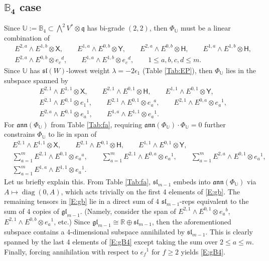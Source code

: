 \documentclass[10pt,a4paper]{amsart}
\newcommand\tensor{\otimes}
\DeclareMathOperator{\diag}{diag}
\newcommand{\gl}{\mathfrak{gl}}
\newcommand\fann{\mathfrak{ann}}
\newcommand\fsl{\mathfrak{sl}}
\newcommand\fq {\mathfrak{q}}
\newcommand{\R}{\mathbb{R}}
\newcommand\bbU{\mathbb{U}}
\newcommand\bbB{\mathbb{B}}
\newcommand\sfX{\mathsf{X}}
\newcommand\sfH{\mathsf{H}}
\newcommand\sfY{\mathsf{Y}}
\numberwithin{equation}{section}
\begin{document}
\subsection[B\_4 case]{$\boldsymbol{\bbB_4}$ case} \label{S:PhiB4}
Since $\bbU := \bbB_4 \subset \bigwedge^2 V^* \otimes \fq$ has bi-grade $(2,2)$, then $\Phi_{\bbU}$ must be a linear combination of
\begin{align*}
& E^{2,a} \wedge E^{1,b} \tensor \sfX,\qquad E^{1,a} \wedge E^{0,b} \tensor \sfY,\qquad E^{2,a} \wedge E^{0,b} \tensor \sfH, \qquad E^{1,a} \wedge E^{1,b} \tensor \sfH,\\
& E^{2,a} \wedge E^{0,b} \tensor e_c{}^d, \qquad E^{1,a} \wedge E^{1,b} \tensor e_c{}^d, \qquad 1 \le a, b,c,d \le m.
\end{align*}
Since $\bbU$ has $\fsl(W)$-lowest weight $\lambda= -2\epsilon_1$ (Table \ref{Tab:EP}), then $\Phi_{\bbU}$ lies in the subspace spanned by
{\samepage\begin{align}
& E^{2,1} \wedge E^{1,1} \tensor \sfX, \qquad E^{2,1} \wedge E^{0,1} \tensor \sfH, \qquad E^{1,1} \wedge E^{0,1} \tensor \sfY,\nonumber\\
& E^{2,1} \wedge E^{0,1} \tensor e_1{}^1, \qquad E^{2,1} \wedge E^{0,1} \tensor e_a{}^a, \qquad E^{2,1} \wedge E^{0,a} \tensor e_a{}^1, \nonumber\\
& E^{2,a} \wedge E^{0,1} \tensor e_a{}^1, \qquad E^{1,a} \wedge E^{1,1} \tensor e_a{}^1.\label{E:gb}
\end{align}}
For $\fann(\Phi_{\bbU})$ from Table \ref{Tab:fa}, requiring $\fann(\Phi_{\bbU}) \cdot \Phi_{\bbU} = 0$ further constrains $\Phi_{\bbU}$ to lie in span of
\begin{align}\label{E:gB4}
&E^{2,1} \wedge E^{1,1} \tensor \sfX, \qquad E^{2,1} \wedge E^{0,1} \tensor \sfH, \qquad E^{1,1} \wedge E^{0,1} \tensor \sfY,\nonumber \\
& \sum_{a=1}^m E^{2,1} \wedge E^{0,1} \tensor e_a{}^a, \qquad \sum_{a=1}^m E^{2,1} \wedge E^{0,a} \tensor e_a{}^1, \qquad \sum_{a=1}^m E^{2,a} \wedge E^{0,1} \tensor e_a{}^1,\nonumber\\
& \sum_{a=1}^m E^{1,a} \wedge E^{1,1} \tensor e_a{}^1.
\end{align}
Let us briefly explain this. From Table \ref{Tab:fa}, $\fsl_{m-1}$ embeds into $\fann(\Phi_{\bbU})$ via $A \mapsto \diag(0,A)$, which acts trivially on the first 4 elements of \eqref{E:gb}. The remaining tensors in \eqref{E:gb} lie in a direct sum of 4 $\fsl_{m-1}$-reps equivalent to the sum of 4 copies of $\gl_{m-1}$. (Namely, consider the span of $E^{2,1} \wedge E^{0,1} \tensor e_a{}^b$, $E^{2,1} \wedge E^{0,b} \tensor e_a{}^1$, etc.) Since $\gl_{m-1} \cong \R \oplus \fsl_{m-1}$, then the aforementioned subspace contains a 4-dimensional subspace annihilated by $\fsl_{m-1}$. This is clearly spanned by the last 4 elements of \eqref{E:gB4} except taking the sum over $2 \leq a \leq m$. Finally, forcing annihilation with respect to $e_f{}^1$ for $f \geq 2$ yields \eqref{E:gB4}.
\end{document}
